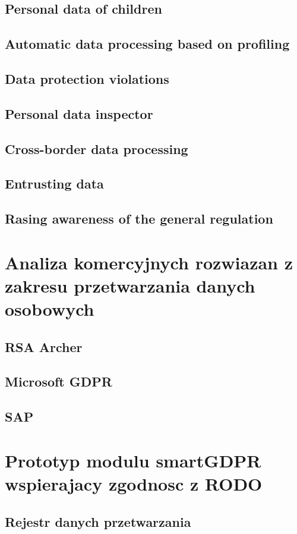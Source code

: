 \documentclass[en, noamssymb]{mgr}
\begin{document}
\section{Personal data of children}
\section{Automatic data processing based on profiling}
\section{Data protection violations}
\section{Personal data inspector}
\section{Cross-border data processing}
\section{Entrusting data}
\section{Rasing awareness of the general regulation}

\chapter{Analiza komercyjnych rozwiazan z zakresu przetwarzania danych osobowych} \label{sec:sekcjaAnalizaRozwiazan}
\section{RSA Archer}
\section{Microsoft GDPR}
\section{SAP}

\chapter{Prototyp modulu smartGDPR wspierajacy zgodnosc z RODO} \label{sec:sekcjaOpisPrototypu}
\section{Rejestr danych przetwarzania}
\end{document}
